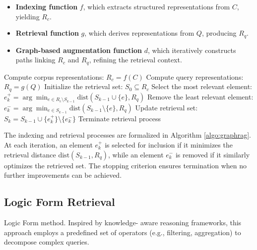 \documentclass[11pt]{article}
\begin{document}
\begin{itemize}[noitemsep, topsep=0pt, leftmargin=*]
    \item \textbf{Indexing function} $f$, which extracts structured representations from $C$, yielding $R_c$.
    \item \textbf{Retrieval function} $g$, which derives representations from $Q$, producing $R_q$.
    \item \textbf{Graph-based augmentation function} $d$, which iteratively constructs paths linking $R_c$ and $R_q$, refining the retrieval context.
\end{itemize}

\begin{algorithm}[ht]
\caption{GraphRAG}
\begin{algorithmic}[1]
\State Compute corpus representations: $R_c = f(C)$
\State Compute query representations: $R_q = g(Q)$
\State Initialize the retrieval set:  $S_0 \subseteq R_c$
    \State Select the most relevant element: $e_k^+ = \arg\min_{e \in R_c \setminus S_{k-1}} \text{dist}(S_{k-1} \cup \{ e \}, R_q)$
    \State Remove the least relevant element: $e_k^- = \arg\min_{e \in S_{k-1}} \text{dist}(S_{k-1} \setminus \{ e \}, R_q)$
    \State Update retrieval set: $S_k = S_{k-1} \cup \{ e_k^+ \} \setminus \{ e_k^- \}$
        \State Terminate retrieval process
    \EndIf
\EndFor
\end{algorithmic}
\label{algo:graphrag}
\end{algorithm}

The indexing and retrieval processes are formalized in Algorithm \ref{algo:graphrag}. At each iteration, an element \(e_k^+\) is selected for inclusion if it minimizes the retrieval distance \(\text{dist}(S_{k-1}, R_q)\), while an element \(e_k^-\) is removed if it similarly optimizes the retrieved set. The stopping criterion ensures termination when no further improvements can be achieved.

\subsection{Logic Form Retrieval}
\label{sec:A.2}
Logic Form method. Inspired by knowledge-
aware reasoning frameworks, this approach employs a predefined set of operators (e.g., filtering, aggregation) to decompose complex queries.
\end{document}
